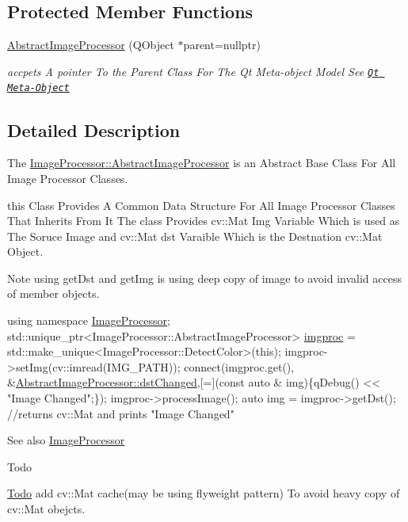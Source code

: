 \subsection*{Protected Member Functions}
\begin{DoxyCompactItemize}
\item 
\hyperlink{class_image_processor_1_1_abstract_image_processor_a5d89a80ba5924d41809a877e4128039a}{Abstract\+Image\+Processor} (Q\+Object $\ast$parent=nullptr)
\begin{DoxyCompactList}\small\item\em accpets A pointer To the Parent Class For The Qt Meta-\/object Model See \href{http://doc.qt.io/qt-5/metaobjects.html}{\tt Qt Meta-\/\+Object} \end{DoxyCompactList}\end{DoxyCompactItemize}


\subsection{Detailed Description}
The \hyperlink{class_image_processor_1_1_abstract_image_processor}{Image\+Processor\+::\+Abstract\+Image\+Processor} is an Abstract Base Class For All Image Processor Classes. 

this Class Provides A Common Data Structure For All Image Processor Classes That Inherits From It The class Provides cv\+::\+Mat Img Variable Which is used as The Soruce Image and cv\+::\+Mat dst Varaible Which is the Destnation cv\+::\+Mat Object. \begin{DoxyNote}{Note}
using get\+Dst and get\+Img is using deep copy of image to avoid invalid access of member objects.
\end{DoxyNote}

\begin{DoxyCode}
\textcolor{keyword}{using namespace }\hyperlink{namespace_image_processor}{ImageProcessor};
std::unique\_ptr<ImageProcessor::AbstractImageProcessor> \hyperlink{namespace_image_processor}{imgproc} = 
      std::make\_unique<ImageProcessor::DetectColor>(\textcolor{keyword}{this});
imgproc->setImg(cv::imread(IMG\_PATH));
connect(imgproc.get(), &\hyperlink{class_image_processor_1_1_abstract_image_processor_ab42f4411848b924971026c104b9a5342}{AbstractImageProcessor::dstChanged},[=](\textcolor{keyword}{const} \textcolor{keyword}{auto}
      & img)\{qDebug() << \textcolor{stringliteral}{"Image Changed"};\});
imgproc->processImage();
\textcolor{keyword}{auto} img = imgproc->getDst(); \textcolor{comment}{//returns cv::Mat and prints "Image Changed"}
\end{DoxyCode}
 \begin{DoxySeeAlso}{See also}
\hyperlink{namespace_image_processor}{Image\+Processor} 
\end{DoxySeeAlso}
\begin{DoxyRefDesc}{Todo}
\item[\hyperlink{todo__todo000001}{Todo}]add cv\+::\+Mat cache(may be using flyweight pattern) To avoid heavy copy of cv\+::\+Mat obejcts. \end{DoxyRefDesc}


